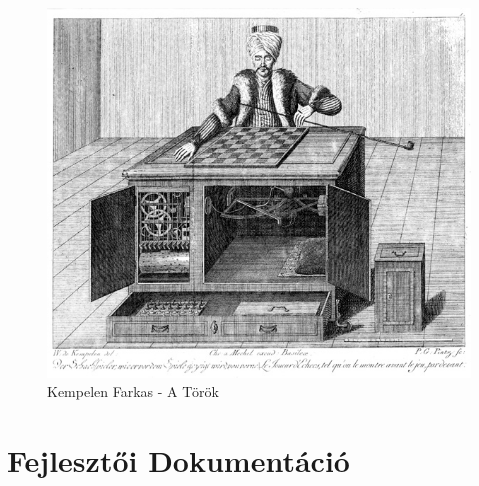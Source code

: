 \documentclass[twoside, a4paper, 12pt]{article}
\begin{document}
\begin{figure}[htbp]
	\centering
	\includegraphics[width=1.0\textwidth]{img/the_turk}
	\caption{Kempelen Farkas - A Török}
	\label{fig:the_turk}
\end{figure}










\newpage
\part{Fejlesztői Dokumentáció}
\end{document}
